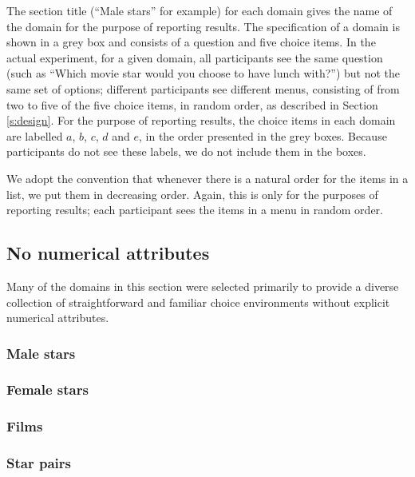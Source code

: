 \documentclass[11pt,letter]{article}
\newcommand{\menu}{menu}
\newcommand{\menus}{menus}
\begin{document}
The section title (``Male stars'' for example) for each domain gives the name of the domain for the purpose of reporting results.
The specification of a domain is shown in a grey box and consists of a question and five choice items.
In the actual experiment, for a given domain, all participants see the same question (such as ``Which movie star would you choose to have lunch with?'') but not the same set of options; different participants see different \menus{}, consisting of from two to five of the five choice items, in random order, as described in Section \ref{s:design}.
For the purpose of reporting results, the choice items in each domain are labelled $a$, $b$, $c$, $d$ and $e$, in the order presented in the grey boxes.
Because participants do not see these labels, we do not include them in the boxes.

We adopt the convention that whenever there is a natural order for the items in a list, we put them in decreasing order.
Again, this is only for the purposes of reporting results; each participant sees the items in a \menu{} in random order.

\subsection{No numerical attributes}

Many of the domains in this section were selected primarily to provide a diverse collection of straightforward and familiar choice environments without explicit numerical attributes.

\subsubsection{Male stars}



\subsubsection{Female stars}



\subsubsection{Films}



\subsubsection{Star pairs}
\end{document}
